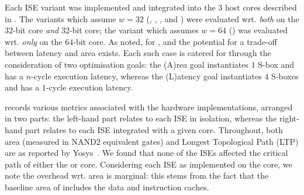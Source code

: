 
Each ISE variant was implemented and integrated into the $3$ host cores 
described in .
The variants which assume  $w = 32$
(, , , and ) 
were evaluated wrt.
{\em both}
on the
$32$-bit  core
{\em  and}
$32$-bit  core;
the variant  which assumes $w = 64$
()
was  evaluated wrt.
{\em only}
on the
$64$-bit  core.
As noted, for ,  and  the potential for a trade-off
between latency and area exists.  Each such case is catered for through
the consideration of two optimisation goals:
the (A)rea    goal
instantiates $1$ S-box   and has a $n$-cycle execution latency,
whereas
the (L)atency goal
instantiates $4$ S-boxes and has a $1$-cycle execution latency.

records
various metrics 
associated with the hardware implementations, 
arranged in two parts: 
the  left-hand part relates to each ISE in isolation,
whereas 
the right-hand part relates to each ISE integrated with a given core.
Throughout, both area (measured in NAND2 equivalent gates) and Longest 
Topological Path (LTP) are as reported by Yosys~\cite{yosys}.  We found 
that none of the ISEs affected the critical path of either the  
or  core.
Considering each ISE as implemented on the  core, we note the 
overhead wrt. area is marginal: this stems from the fact that the 
baseline area of  includes the data and instruction caches.

